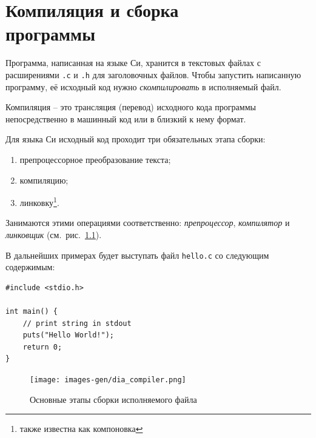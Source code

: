 \documentclass[myc.tex]{subfiles}
\begin{document}
\chapter[Компиляция и сборка программы]{Компиляция и сборка\\ программы}

Программа, написанная на языке Си, хранится в текстовых файлах с расширениями \texttt{.c} и \texttt{.h} для заголовочных файлов. Чтобы запустить написанную программу, её исходный код нужно \textit{скомпилировать} в исполняемый файл.

Компиляция -- это трансляция (перевод) исходного кода программы непосредственно в машинный код или в близкий к нему формат.

Для языка Си исходный код проходит три обязательных этапа сборки:
\begin{enumerate}
\item препроцессорное преобразование текста;
\item компиляцию;
\item линковку\footnote{также известна как компоновка}.
\end{enumerate}

Занимаются этими операциями соответственно: \textit{препроцессор}, \textit{компилятор} и \textit{линковщик} (см.~рис.~\ref{fig:compiler}).

В дальнейших примерах будет выступать файл \texttt{hello.c} со следующим содержимым:

\begin{lstlisting}[title=Программа <<Hello World>> (\texttt{hello.c})]
#include <stdio.h>

int main() {
    // print string in stdout
    puts("Hello World!");
    return 0;
}
\end{lstlisting}










\begin{figure}[ht]
\centering
\texttt{[image: images-gen/dia\_compiler.png]}
\caption{Основные этапы сборки исполняемого файла}
\label{fig:compiler}
\end{figure}
\end{document}
